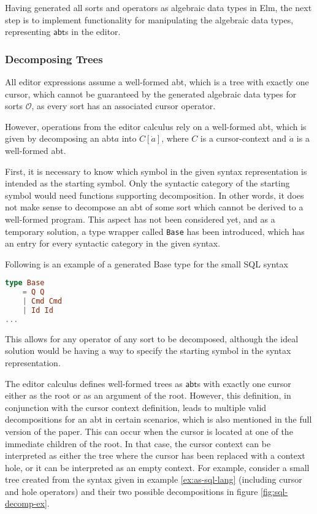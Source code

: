 \documentclass[sigplan]{acmart}
\newcommand{\abt}{\textsf{abt}\xspace}
\begin{document}
Having generated all sorts and operators as algebraic data types in Elm,
the next step is to implement functionality for manipulating the algebraic
data types, representing $\abt$s in the editor.

\subsubsection{Decomposing Trees}

All editor expressions assume a well-formed \abt, which is a tree
with exactly one cursor, which cannot be guaranteed by the generated
algebraic data types for sorts $\mathcal{O}$, as every sort has an associated cursor operator.

However, operations from the editor calculus rely on a well-formed \abt, which is given
by decomposing an \abt $a$ into $C[\dot{a}]$, where $C$ is a
cursor-context and $\dot{a}$ is a
well-formed \abt.

First, it is necessary to know which symbol in the given syntax representation
is intended as the starting symbol. Only the syntactic category of the starting symbol
would need functions supporting decomposition.
In other words, it does not make sense to decompose an \abt of some sort which
cannot be derived to a well-formed program.
This aspect has not been considered yet, and as a temporary solution,
a type wrapper called \texttt{Base} has been introduced, which has an entry for
every syntactic category in the given syntax.

\begin{example}\label{ex:c-spec}
Following is an example of a generated Base type for the small SQL syntax
  \begin{lstlisting}[language=elm,style=examplestyle]
type Base
    = Q Q
    | Cmd Cmd
    | Id Id
...
\end{lstlisting}
\end{example}

This allows for any operator
of any sort to be decomposed, although the ideal solution would be having
a way to specify the starting symbol in the syntax representation.

The editor calculus defines well-formed trees as $\abt$s
with exactly one cursor either as the root or as an argument of the root.
However, this definition, in conjunction with the cursor context definition,
leads to multiple valid decompositions for an \abt in certain scenarios,
which is also mentioned in the full version of the paper. This can occur when the cursor is located
at one of the immediate children of the root. In that case, the cursor context
can be interpreted as either the tree where the cursor has been replaced with a
context hole, or it can be interpreted as an empty context.
For example, consider a small tree created from the syntax given in
example \cref{ex:as-sql-lang} (including cursor and hole operators) and
their two possible decompositions in figure \cref{fig:sql-decomp-ex}.
\end{document}
